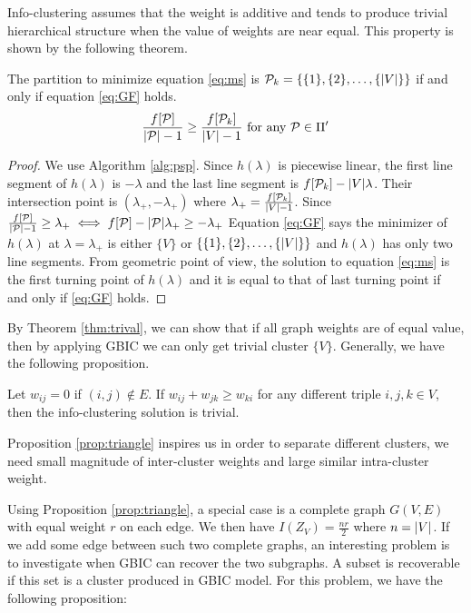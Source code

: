 Info-clustering assumes that the weight is additive and tends to produce trivial hierarchical structure when the value of weights are near equal. This property is shown by the following theorem.
\begin{theorem}\label{thm:trival}
The partition to minimize equation \eqref{eq:ms} is $\mathcal{P}_k = \{\{1\},\{2\},\dots,\{\lvert V\rvert\}\}$ if and only if equation \eqref{eq:GF} holds.
\begin{equation}\label{eq:GF}
\frac{f[\mathcal{P}]}{\lvert\mathcal{P}\rvert-1} \geq \frac{f[\mathcal{P}_k]}{\lvert V\rvert-1} \textrm{ for any } \mathcal{P} \in \Pi'
\end{equation}
\end{theorem}
\begin{proof}
We use Algorithm \ref{alg:psp}. Since $h(\lambda)$ is piecewise linear, the first line segment of $h(\lambda)$ is $ - \lambda $ and the last line segment is $ f[\mathcal{P}_k] - \lvert V\rvert \lambda$. Their intersection point is $(\lambda_{+}, -\lambda_{+})$ where $\lambda_{+} = \frac{f[\mathcal{P}_k]}{\lvert V\rvert-1}$. Since $\frac{f[\mathcal{P}]}{\lvert\mathcal{P}\rvert-1} \geq \lambda_{+} \iff f[\mathcal{P}] - \lvert\mathcal{P}\rvert\lambda_{+} \geq - \lambda_{+}$ Equation \eqref{eq:GF} says the minimizer of $h(\lambda)$ at $\lambda = \lambda_{+}$ is either $\{V\}$ or $\{\{1\},\{2\},\dots,\{\lvert V\rvert\}\}$ and $h(\lambda)$ has only two line segments. From geometric point of view, the solution to equation \eqref{eq:ms} is the first turning point of $h(\lambda)$ and it is equal to that of last turning point if and only if \eqref{eq:GF} holds.
\end{proof}
By Theorem \ref{thm:trival}, we can show that if all graph weights are of equal value, then by applying GBIC we can only get trivial cluster $\{V\}$. Generally, we have the following proposition.

\begin{proposition}\label{prop:triangle}
Let $w_{ij}=0$ if $(i,j)\not\in E$. If $w_{ij} + w_{jk} \geq w_{ki}$ for any different triple $i, j, k \in V$, then the info-clustering solution is trivial\footnotemark.
\end{proposition}


Proposition \ref{prop:triangle} inspires us in order to separate different clusters, we need small magnitude of inter-cluster weights and large similar intra-cluster weight. 

Using Proposition \ref{prop:triangle}, a special case is a complete graph $G(V,E)$ with equal weight $r$ on each edge. We then have $I(Z_{V})=\frac{nr}{2}$ where $n=\lvert V\rvert$. If we add some edge between such two complete graphs, an interesting problem is to investigate when GBIC can recover the two subgraphs. A subset is recoverable if this set is a cluster produced in GBIC model.
For this problem, we have the following proposition:


